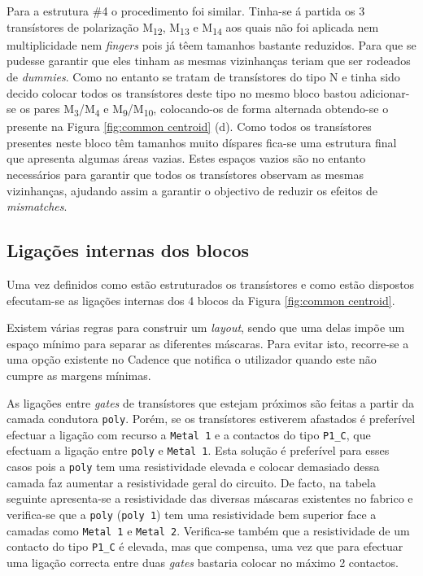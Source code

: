 \documentclass[11pt]{article}
\numberwithin{equation}{section}
\begin{document}
Para a estrutura \#4 o procedimento foi similar. Tinha-se á partida os 3 transístores de polarização M\textsubscript{12}, M\textsubscript{13} e M\textsubscript{14} aos quais não foi aplicada nem multiplicidade nem \textit{fingers} pois já têem tamanhos bastante reduzidos. Para que se pudesse garantir que eles tinham as mesmas vizinhanças teriam que ser rodeados de \textit{dummies}. Como no entanto se tratam de transístores do tipo N e tinha sido decido colocar todos os transístores deste tipo no mesmo bloco bastou adicionar-se os pares  M\textsubscript{3}/M\textsubscript{4} e  M\textsubscript{9}/M\textsubscript{10}, colocando-os de forma alternada obtendo-se o presente na Figura \ref{fig:common centroid} (d). Como todos os transístores presentes neste bloco têm tamanhos muito díspares fica-se uma estrutura final que apresenta algumas áreas vazias. Estes espaços vazios são no entanto necessários para garantir que todos os transístores observam as mesmas vizinhanças, ajudando assim a garantir o objectivo de reduzir os efeitos de \textit{mismatches}.

\subsection{Ligações internas dos blocos}

Uma vez definidos como estão estruturados os transístores e como estão dispostos efecutam-se as ligações internas dos 4 blocos da Figura \ref{fig:common centroid}.

Existem várias regras para construir um \textit{layout}, sendo que uma delas impõe um espaço mínimo para separar as diferentes máscaras. Para evitar isto, recorre-se a uma opção existente no Cadence que notifica o utilizador quando este não cumpre as margens mínimas. 

As ligações entre \textit{gates} de transístores que estejam próximos são feitas a partir da camada condutora \texttt{poly}. Porém, se os transístores estiverem afastados é preferível efectuar a ligação com recurso a \texttt{Metal 1} e a contactos do tipo \texttt{P1\_C}, que efectuam a ligação entre \texttt{poly} e \texttt{Metal 1}. Esta solução é preferível para esses casos pois a \texttt{poly} tem uma resistividade elevada e colocar demasiado dessa camada faz aumentar a resistividade geral do circuito. De facto, na tabela seguinte apresenta-se a resistividade das diversas máscaras existentes no fabrico e verifica-se que a \texttt{poly} (\texttt{poly 1}) tem uma resistividade bem superior face a camadas como \texttt{Metal 1} e \texttt{Metal 2}. Verifica-se também que a resistividade de um contacto do tipo \texttt{P1\_C} é elevada, mas que compensa, uma vez que para efectuar uma ligação correcta entre duas \textit{gates} bastaria colocar no máximo 2 contactos.
\end{document}
